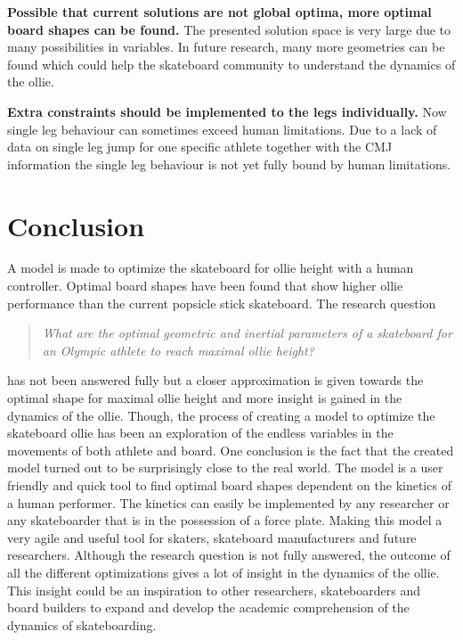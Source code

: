 \documentclass[default,iicol]{sn-jnl}
\begin{document}
\noindent\textbf{Possible that current solutions are not global optima, more optimal board shapes can be found.} The presented solution space is very large due to many possibilities in variables. In future research, many more geometries can be found which could help the skateboard community to understand the dynamics of the ollie. 

\noindent\textbf{Extra constraints should be implemented to the legs individually.} Now single leg behaviour can sometimes exceed human limitations. Due to a lack of data on single leg jump for one specific athlete together with the CMJ information the single leg behaviour is not yet fully bound by human limitations.

\section{Conclusion}
\noindent A model is made to optimize the skateboard for ollie height with a human controller. Optimal board shapes have been found that show higher ollie performance than the current popsicle stick skateboard. The research question 
\begin{quote}
\textit{What are the optimal geometric and inertial parameters of a skateboard for an Olympic athlete to reach maximal ollie height? 
}\end{quote}
has not been answered fully but a closer approximation is given towards the optimal shape for maximal ollie height and more insight is gained in the dynamics of the ollie. Though, the process of creating a model to optimize the skateboard ollie has been an exploration of the endless variables in the movements of both athlete and board. One conclusion is the fact that the created model turned out to be surprisingly close to the real world. The model is a user friendly and quick tool to find optimal board shapes dependent on the kinetics of a human performer. The kinetics can easily be implemented by any researcher or any skateboarder that is in the possession of a force plate. Making this model a very agile and useful tool for skaters, skateboard manufacturers and future researchers. Although the research question is not fully answered, the outcome of all the different optimizations gives a lot of insight in the dynamics of the ollie. This insight could be an inspiration to other researchers, skateboarders and board builders to expand and develop the academic comprehension of the dynamics of skateboarding. 



\end{document}
